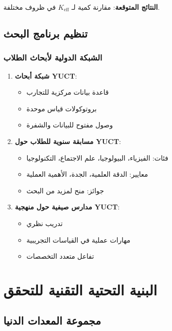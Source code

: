 \documentclass[12pt,a4paper]{article}
\begin{document}
	\textbf{النتائج المتوقعة}: مقارنة كمية لـ $K_{\mathrm{eff}}$ في ظروف مختلفة.
	
	\subsection{تنظيم برنامج البحث}
	
	\subsubsection{الشبكة الدولية لأبحاث الطلاب}
	
	\begin{enumerate}
		\item \textbf{شبكة أبحاث YUCT}:
		\begin{itemize}
			\item قاعدة بيانات مركزية للتجارب
			\item بروتوكولات قياس موحدة
			\item وصول مفتوح للبيانات والشفرة
		\end{itemize}
		
		\item \textbf{مسابقة سنوية للطلاب حول YUCT}:
		\begin{itemize}
			\item فئات: الفيزياء، البيولوجيا، علم الاجتماع، التكنولوجيا
			\item معايير: الدقة العلمية، الجدة، الأهمية العملية
			\item جوائز: منح لمزيد من البحث
		\end{itemize}
		
		\item \textbf{مدارس صيفية حول منهجية YUCT}:
		\begin{itemize}
			\item تدريب نظري
			\item مهارات عملية في القياسات التجريبية
			\item تفاعل متعدد التخصصات
		\end{itemize}
	\end{enumerate}
	
	\section{البنية التحتية التقنية للتحقق}
	
	\subsection{مجموعة المعدات الدنيا}
	
\end{document}
